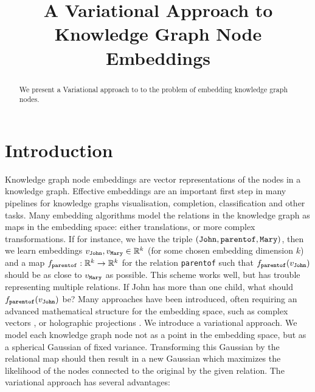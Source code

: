 \documentclass[11pt]{article}
\title{A Variational Approach to Knowledge Graph Node Embeddings}
\begin{document}
\newcommand{\R}{{\mathbb R}}
\newcommand{\fw}[1]{\text{\texttt{#1}}}

\maketitle

\begin{abstract}

	We present a Variational approach to to the problem of embedding knowledge graph nodes.
\end{abstract}	

\section{Introduction}
	Knowledge graph node embeddings are vector representations of the nodes in a knowledge graph. Effective embeddings are an important first step in many pipelines for knowledge graphs visualisation, completion, classification and other tasks. Many embedding algorithms model the relations in the knowledge graph as maps in the embedding space: either translations, or more complex transformations. If for instance, we have the triple $(\fw{John}, \fw{parentof}, \fw{Mary})$, then we learn embeddings $v_\fw{John}, v_\fw{Mary} \in \R^k$  (for some chosen embedding dimension $k$) and a map $f_\fw{parentof} : \R^k \to \R^k$ for the relation \texttt{parentof} such that $f_\fw{parentof}(v_\fw{John})$ should be as close to $v_\fw{Mary}$ as possible.
	This scheme works well, but has trouble representing multiple relations. If John has more than one child, what should $f_\fw{parentof}(v_\fw{John})$ be? Many approaches have been introduced, often requiring an advanced mathematical structure for the embedding space, such as complex vectors \cite{trouillon2016complex}, or holographic projections \cite{nickel2016holographic}.
	We introduce a variational approach. We model each knowledge graph node not as a point in the embedding space, but as a spherical Gaussian of fixed variance. Transforming this Gaussian by the relational map should then result in a new Gaussian which maximizes the likelihood of the nodes connected to the original by the given relation.\footnotemark
	The variational approach has several advantages:
\end{document}
